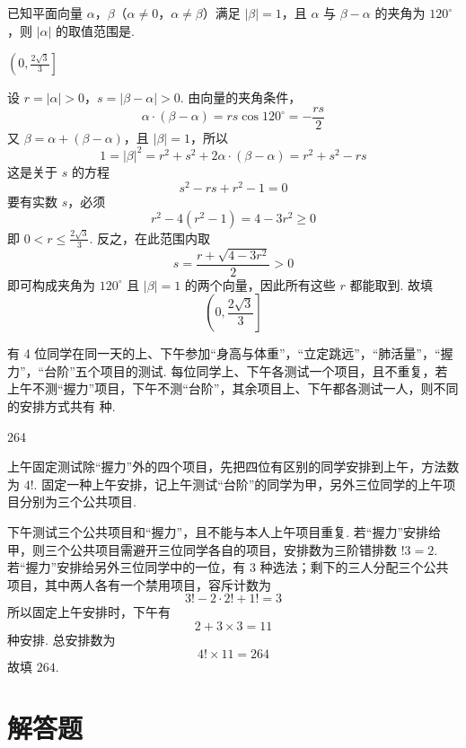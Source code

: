 \begin{problem}
已知平面向量 \(\alpha\)，\(\beta\)（\(\alpha \neq 0\)，\(\alpha \neq \beta\)）满足 \(|\beta| = 1\)，且 \(\alpha\) 与 \(\beta - \alpha\) 的夹角为 \(120^{\circ}\)，则 \(|\alpha|\) 的取值范围是\fillinblank{}.
\begin{answer}
\(\left(0,\frac{2\sqrt{3}}{3}\right]\)
\end{answer}

\begin{solution}
设 \(r=|\alpha|>0\)，\(s=|\beta-\alpha|>0\). 由向量的夹角条件，
\[
\alpha\cdot(\beta-\alpha)=rs\cos120^{\circ}=-\frac{rs}{2}
\]
又 \(\beta=\alpha+(\beta-\alpha)\)，且 \(|\beta|=1\)，所以
\[
1=|\beta|^2=r^2+s^2+2\alpha\cdot(\beta-\alpha)=r^2+s^2-rs
\]
这是关于 \(s\) 的方程
\[
s^2-rs+r^2-1=0
\]
要有实数 \(s\)，必须
\[
r^2-4(r^2-1)=4-3r^2\geqslant0
\]
即 \(0<r\leqslant\frac{2\sqrt3}{3}\). 反之，在此范围内取
\[
s=\frac{r+\sqrt{4-3r^2}}{2}>0
\]
即可构成夹角为 \(120^{\circ}\) 且 \(|\beta|=1\) 的两个向量，因此所有这些 \(r\) 都能取到. 故填
\[
\left(0,\frac{2\sqrt3}{3}\right]
\]
\end{solution}
\end{problem}

\begin{problem}
有 4 位同学在同一天的上、下午参加“身高与体重”，“立定跳远”，“肺活量”，“握力”，“台阶”五个项目的测试. 每位同学上、下午各测试一个项目，且不重复，若上午不测“握力”项目，下午不测“台阶”，其余项目上、下午都各测试一人，则不同的安排方式共有\fillinblank{} 种.
\begin{answer}
264
\end{answer}

\begin{solution}
上午固定测试除“握力”外的四个项目，先把四位有区别的同学安排到上午，方法数为 \(4!\). 固定一种上午安排，记上午测试“台阶”的同学为甲，另外三位同学的上午项目分别为三个公共项目.

下午测试三个公共项目和“握力”，且不能与本人上午项目重复. 若“握力”安排给甲，则三个公共项目需避开三位同学各自的项目，安排数为三阶错排数 \(!3=2\). 若“握力”安排给另外三位同学中的一位，有 \(3\) 种选法；剩下的三人分配三个公共项目，其中两人各有一个禁用项目，容斥计数为
\[
3!-2\cdot2!+1!=3
\]
所以固定上午安排时，下午有
\[
2+3\times3=11
\]
种安排. 总安排数为
\[
4!\times11=264
\]
故填 \(264\).
\end{solution}
\end{problem}

\section{解答题}

